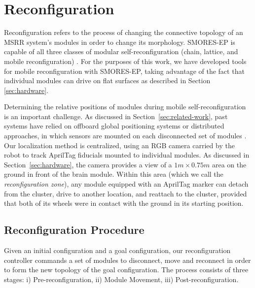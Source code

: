 \documentclass[conference]{IEEEtran}
\newcommand{\TODO}[1]{ {\bf \textcolor{red}{TODO:} #1 }}
\begin{document}
\section{Reconfiguration}
\label{sec:reconfiguration}
%
Reconfiguration refers to the process of changing the connective topology of an MSRR system's modules in order to change its morphology.  SMORES-EP is capable of all three classes of modular self-reconfiguration (chain, lattice, and mobile reconfiguration) \cite{Davey2012,yim2003modular}.  For the purposes of this work, we have developed tools for mobile reconfiguration with SMORES-EP, taking advantage of the fact that individual modules can drive on flat surfaces as described in Section \ref{sec:hardware}.

Determining the relative positions of modules during mobile self-reconfiguration is an important challenge. As discussed in Section~\ref{sec:related-work}, past systems have relied on offboard global positioning systems \cite{Paulos2015} or distributed approaches, in which sensors are mounted on each disconnected set of modules \cite{Yim2007}.  Our localization method is centralized, using an RGB camera carried by the robot to track AprilTag fiducials mounted to individual modules.  As discussed in Section~\ref{sec:hardware}, the camera provides a view of a $1m\times0.75m$ area on the ground in front of the brain module.  Within this area (which we call the \emph{reconfiguration zone}), any module equipped with an AprilTag marker can detach from the cluster, drive to another location, and reattach to the cluster, provided that both of its wheels were in contact with the ground in its starting position.%

\subsection{Reconfiguration Procedure}
Given an initial configuration and a goal configuration, our reconfiguration controller commands a set of modules to disconnect, move and reconnect in order to form the new topology of the goal configuration. The process consists of three stages: i) Pre-reconfiguration, ii) Module Movement, iii) Post-reconfiguration.
\end{document}
